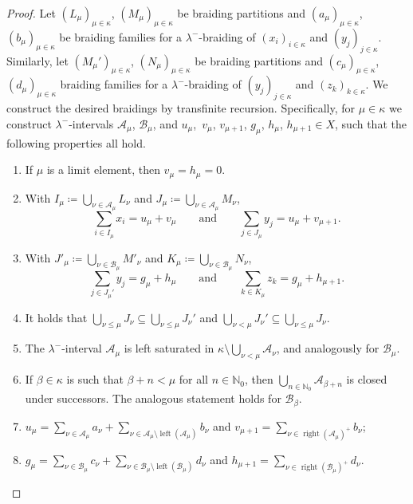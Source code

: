 \documentclass[a4paper,11pt,oneside]{amsart}
\theoremstyle{remark}
\newcommand{\bN}{\mathbb N}
\newcommand{\cA}{\mathcal A}
\newcommand{\cB}{\mathcal B}
\DeclareMathOperator{\rep}{right}
\DeclareMathOperator{\lep}{left}
\begin{document}
\begin{proof}
  Let $(L_\mu)_{\mu \in \kappa}$, $(M_\mu)_{\mu \in \kappa}$ be braiding partitions and $(a_\mu)_{\mu \in \kappa}$, $(b_\mu)_{\mu \in \kappa}$ be braiding families for a $\lambda^-$-braiding of $(x_i)_{i \in \kappa}$ and $(y_j)_{j \in \kappa}$.
  Similarly, let $(M_\mu')_{\mu \in \kappa}$, $(N_\mu)_{\mu \in \kappa}$ be braiding partitions and $(c_\mu)_{\mu \in \kappa}$, $(d_\mu)_{\mu \in \kappa}$ braiding families for a $\lambda^-$-braiding of $(y_j)_{j \in \kappa}$ and $(z_k)_{k \in \kappa}$.
    We construct the desired braidings by transfinite recursion.
    Specifically, for $\mu \in \kappa$ we construct $\lambda^-$-intervals $\cA_\mu$, $\cB_\mu$, and $u_\mu$,~$v_\mu$, $v_{\mu+1}$, $g_\mu$, $h_{\mu}$, $h_{\mu+1} \in X$, such that the following properties all hold.
    \begin{enumerate}
    \item If $\mu$ is a limit element, then $v_\mu=h_\mu=0$.
    \item \label{tr:eqn-xy} With $I_\mu \coloneqq \bigcup_{\nu \in \cA_\mu} L_\nu$ and $J_\mu \coloneqq \bigcup_{\nu \in \cA_\mu} M_\nu$,
      \[
        \sum_{i \in I_\mu} x_i = u_\mu + v_\mu \qquad\text{and}\qquad \sum_{j \in J_\mu} y_j = u_\mu + v_{\mu+1}.
      \]
    \item \label{tr:eqn-yz} With $J'_\mu \coloneqq \bigcup_{\nu \in \cB_\mu} M'_\nu$ and $K_\mu \coloneqq \bigcup_{\nu \in \cB_\mu} N_\nu$,
      \[
        \sum_{j \in J_\mu'} y_j = g_\mu + h_\mu \qquad\text{and}\qquad \sum_{k \in K_\mu} z_k = g_\mu + h_{\mu+1}.
      \]
    \item It holds that $\bigcup_{\nu \le \mu} J_\nu \subseteq \bigcup_{\nu \le \mu} J_\nu'$ and $\bigcup_{\nu < \mu} J_{\nu}' \subseteq \bigcup_{\nu \le \mu} J_\nu$.
    \item The $\lambda^-$-interval $\cA_\mu$ is left saturated in $\kappa \setminus \bigcup_{\nu < \mu} \cA_\nu$, and analogously for $\cB_\mu$.
    \item \label{tr:right-saturated} If $\beta \in \kappa$ is such that $\beta + n < \mu$ for all $n \in \bN_0$, then $\bigcup_{n \in \bN_0} \cA_{\beta+n}$ is closed under successors.
      The analogous statement holds for $\cB_\beta$.
    \item \label{tr:formula-uv} $u_\mu = \sum_{\nu \in \cA_\mu} a_\nu + \sum_{\nu \in \cA_\mu \setminus \lep(\cA_\mu)} b_\nu$ and $v_{\mu + 1} = \sum_{\nu \in \rep(\cA_\mu)^+} b_\nu$;
    \item \label{tr:formula-gh} $g_\mu = \sum_{\nu \in \cB_\mu} c_\nu + \sum_{\nu \in \cB_\mu \setminus \lep(\cB_\mu)} d_\nu$ and $h_{\mu + 1} = \sum_{\nu \in \rep(\cB_\mu)^+} d_\nu$.
    \end{enumerate}


\end{proof}
\end{document}

